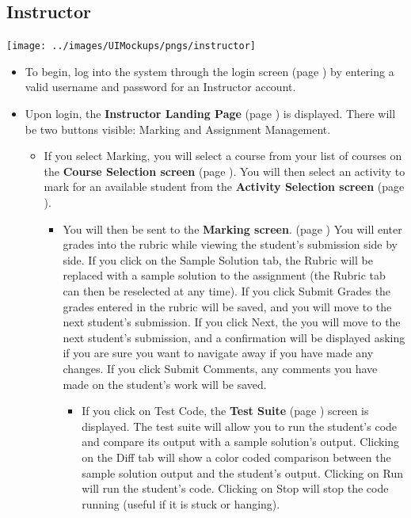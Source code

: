 \documentclass{article}
\begin{document}
\subsection{Instructor}
\centerline{\texttt{[image: ../images/UIMockups/pngs/instructor]}}
\begin{itemize}
  \item To begin, log into the system through the login screen (page \pageref{login})
    by entering a valid username and password for an Instructor account.
  \item Upon login, the \textbf{Instructor Landing Page} (page \pageref{landPg}) 
    is displayed. There will be two buttons visible: Marking and Assignment 
    Management.
    \begin{itemize}
      \item If you select Marking, you will select a course from your list of courses
        on the \textbf{Course Selection screen} (page \pageref{courseSel}). You will then select an activity
        to mark for an available student from the \textbf{Activity Selection screen}
        (page \pageref{actSel}).
        \begin{itemize}
        \item You will then be sent to the \textbf{Marking screen}. (page
	  \pageref{marking}) You will enter grades into the rubric while viewing 
	  the student's submission side by side. If you click on the Sample Solution 
	  tab, the Rubric will be replaced with a sample solution to the assignment 
	  (the Rubric tab can then be reselected at any time). If you click Submit 
	  Grades the grades entered in the rubric will be saved, and you will 
	  move to the next student's submission. If you click Next, the you will 
	  move to the next student's submission, and a confirmation will be displayed 
	  asking if you are sure you want to navigate away if you have made any 
	  changes. If you click Submit Comments, any comments you have made 
	  on the student's work will be saved.
	  \begin{itemize}
	    \item If you click on Test Code, the \textbf{Test Suite} (page 
	      \pageref{testSuite}) screen is displayed. The test suite will allow you 
	      to run the student's code and compare its output with a sample 
	      solution's output. Clicking on the Diff tab will show a color coded 
	      comparison between the sample solution output and the student's 
	      output. Clicking on Run will run the student's code. Clicking on Stop 
	      will stop the code running (useful if it is stuck or hanging).

\end{itemize}
\end{itemize}
\end{itemize}
\end{itemize}
\end{document}
